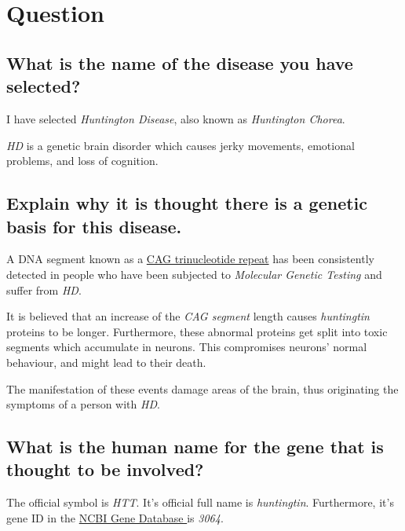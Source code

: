 \section{Question}

\subsection{What is the name of the disease you have selected?}

I have selected \textit{Huntington Disease}, also known as \textit{Huntington Chorea}.

\textit{HD} is a genetic brain disorder which causes jerky movements, emotional problems, and loss of cognition.


\subsection{Explain why it is thought there is a genetic basis for this disease.}

A DNA segment known as a \href{https://ghr.nlm.nih.gov/art/large/repeatexpansion.jpeg}{CAG trinucleotide repeat} has been consistently detected in people who have been subjected to \textit{Molecular Genetic Testing} and suffer from \textit{HD}.

It is believed that an increase of the \textit{CAG segment} length causes \textit{huntingtin} proteins to be longer. Furthermore, these abnormal proteins get split into toxic segments which accumulate in neurons. This compromises neurons' normal behaviour, and might lead to their death.

The manifestation of these events damage areas of the brain, thus originating the symptoms of a person with \textit{HD}.


\subsection{What is the human name for the gene that is thought to be involved?}

The official symbol is \textit{HTT}. It's official full name is \textit{huntingtin}. Furthermore, it's gene ID in the \href{http://www.ncbi.nlm.nih.gov/gene/}{NCBI Gene Database } is \textit{3064}.


